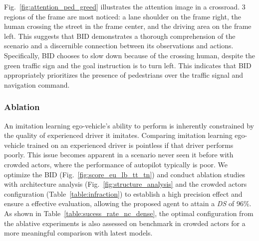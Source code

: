 Fig.~\ref{fig:attention_ped_greed} illustrates the attention image in a crossroad. 
3 regions of the frame are most noticed: a lane shoulder on the frame right, the human crossing the street in the frame center, and the driving area on the frame left. 
This suggests that BID demonstrates a thorough comprehension of the scenario and a discernible connection between its observations and actions. 
Specifically, BID chooses to slow down because of the crossing human, despite the green traffic sign and the goal instruction is to turn left. 
This indicates that BID appropriately prioritizes the presence of pedestrians over the traffic signal and navigation command.





\subsubsection{Ablation}

\hspace{1pc}An imitation learning ego-vehicle's ability to perform is inherently constrained by the quality of experienced driver it imitates. 
Comparing imitation learning ego-vehicle trained on an experienced driver is pointless if that driver performs poorly.
This issue becomes apparent in a scenario never seen it before with crowded actors, where the performance of autopilot typically is poor. 
We optimize the BID (Fig.~\ref{fig:score_eu_lb_tt_tn}) and conduct ablation studies with architecture analysis (Fig.~\ref{fig:structure_analysis} and the crowded actors configuration (Table~\ref{table:infraction}) to establish a high precision effect and ensure a effective evaluation, allowing the proposed agent to attain a \emph{DS} of 96\%. 
As shown in Table~\ref{table:sucess_rate_nc_dense}, the optimal configuration from the ablative experiments is also assessed on benchmark in crowded actors for a more meaningful comparison with latest models.


